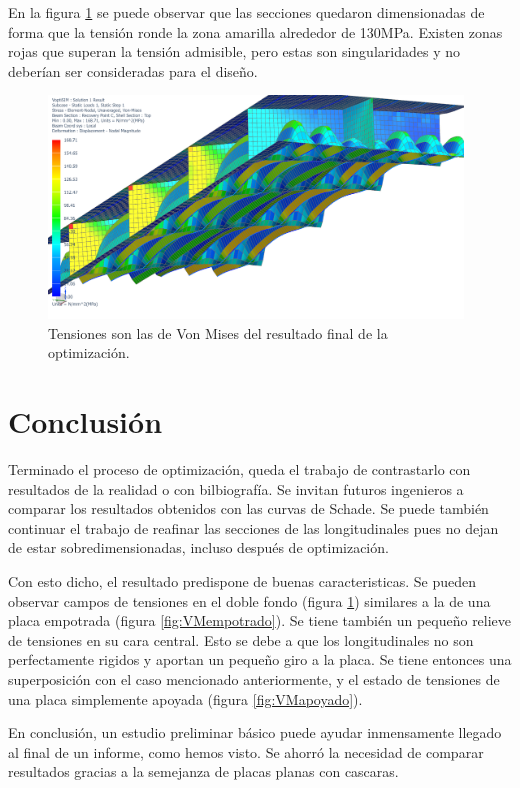 \documentclass[onecolumn,10pt,titlepage]{article}
\newcommand{\unit}[1]{\textsf{#1}}
\newcommand{\mega}{\unit{M}}
\newcommand{\pascal}{\unit{Pa}}
\newcommand{\si}[1]{#1}
\newcommand{\SI}[2]{#1\si{#2}}
\begin{document}
En la figura \ref{fig:optimizacion} se puede observar que las secciones quedaron dimensionadas de forma que la tensión ronde la zona amarilla alrededor de \SI{130}{\mega\pascal}. Existen zonas rojas que superan la tensión admisible, pero estas son singularidades y no deberían ser consideradas para el diseño.

 \begin{figure}
     \centering
     \includegraphics[width=11cm]{fig/VoptiSIM.png}
     \caption{Tensiones son las de Von Mises del resultado final de la optimización.}
     \label{fig:optimizacion}
 \end{figure}

\section{Conclusión}
Terminado el proceso de optimización, queda el trabajo de contrastarlo con resultados de la realidad o con bilbiografía. Se invitan futuros ingenieros a comparar los resultados obtenidos con las curvas de Schade\citep{dominguez1969calculo}. Se puede también continuar el trabajo de reafinar las secciones de las longitudinales pues no dejan de estar sobredimensionadas, incluso después de optimización. 

Con esto dicho, el resultado predispone de buenas caracteristicas. Se pueden observar campos de tensiones en el doble fondo (figura \ref{fig:optimizacion}) similares a la de una placa empotrada (figura \ref{fig:VMempotrado}). Se tiene también un pequeño relieve de tensiones en su cara central. Esto se debe a que los longitudinales no son perfectamente rigidos y aportan un pequeño giro a la placa. Se tiene entonces una superposición con el caso mencionado anteriormente, y el estado de tensiones de una placa simplemente apoyada (figura \ref{fig:VMapoyado}).

En conclusión, un estudio preliminar básico puede ayudar inmensamente llegado al final de un informe, como hemos visto. Se ahorró la necesidad de comparar resultados gracias a la semejanza de placas planas con cascaras.




 
\end{document}
